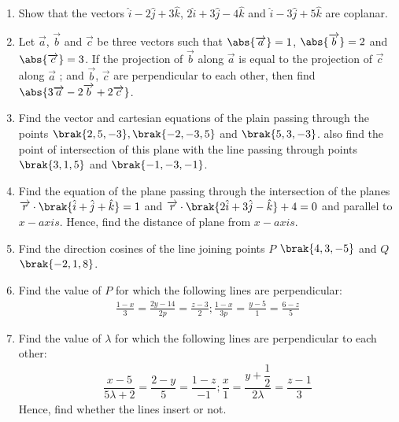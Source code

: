 \begin{enumerate}
\item Show that the vectors $\hat{i} -2 \hat{j} + 3\hat{k}$, $2\hat{i} +3 \hat{j} -4\hat{k}$ and $\hat{i} -3 \hat{j} + 5\hat{k}$ are coplanar.
 \item Let $\overrightarrow{a}$, $\overrightarrow{b} $ and $\overrightarrow{c}$ be three vectors such that $\abs{\overrightarrow{a}}=1$, $\abs {\overrightarrow{b}}=2 $ and $\abs{\overrightarrow{c}}=3$. If the projection of $\overrightarrow{b}$ along $\overrightarrow{a}$ is equal to the projection of $\overrightarrow{c}$ along $\overrightarrow{a}$ ; and $\overrightarrow{b}$, $\overrightarrow{c}$ are perpendicular to each other, then find $\abs{3\overrightarrow{a}- 2\overrightarrow{b} +2\overrightarrow{c}}$.

\item Find the vector and cartesian equations of the plain passing through the points $\brak{2,5,-3},\brak{-2,-3,5}$ and $\brak{5,3,-3}$. also find the point of intersection of this plane with the line passing through points $\brak{3,1,5}$ and $\brak{-1,-3,-1}$.

\item Find the equation of the plane passing through the intersection of the planes $\overrightarrow{r} \cdot\brak{\hat{i} + \hat{j} + \hat{k}}=1$ and $\overrightarrow{r} \cdot \brak{ 2\hat{i}+3\hat{j}-\hat{k}} +4=0$ and parallel to $x-axis$. Hence, find the distance of plane from $x-axis$.

\item Find the direction cosines of the line joining points $P$ $\brak{4,3,-5}$ and $Q$ $\brak{-2,1,8}$.

\item Find the value of $P$ for which the following lines are perpendicular:
 \begin{align*}
 \frac{1-x}{3}=\frac{2y-14}{2p}=\frac{z-3}{2}; \frac{1-x}{3p}=\frac{y-5}{1}=\frac{6-z}{5}
 \end{align*}
 \item Find the value of $\lambda$ for which the following lines are perpendicular to each other:
 \begin{align*}
 \dfrac{x-5}{5\lambda+2}= \dfrac{2-y}{5} = \dfrac{1-z}{-1};\dfrac{x}{1}=\dfrac{y+\dfrac{1}{2}}{2\lambda}=\dfrac{z-1}{3} 
 \end{align*}
Hence, find whether the lines insert or not.


\end{enumerate}

